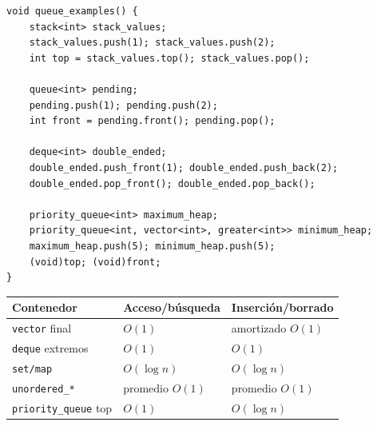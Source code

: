 \begin{lstlisting}[style=cpp]
void queue_examples() {
    stack<int> stack_values;
    stack_values.push(1); stack_values.push(2);
    int top = stack_values.top(); stack_values.pop();

    queue<int> pending;
    pending.push(1); pending.push(2);
    int front = pending.front(); pending.pop();

    deque<int> double_ended;
    double_ended.push_front(1); double_ended.push_back(2);
    double_ended.pop_front(); double_ended.pop_back();

    priority_queue<int> maximum_heap;
    priority_queue<int, vector<int>, greater<int>> minimum_heap;
    maximum_heap.push(5); minimum_heap.push(5);
    (void)top; (void)front;
}
\end{lstlisting}

\begin{center}
\begin{tabular}{lll}
Contenedor & Acceso/b\'usqueda & Inserci\'on/borrado \\
\hline
\texttt{vector} final & $O(1)$ & amortizado $O(1)$ \\
\texttt{deque} extremos & $O(1)$ & $O(1)$ \\
\texttt{set/map} & $O(\log n)$ & $O(\log n)$ \\
\texttt{unordered\_*} & promedio $O(1)$ & promedio $O(1)$ \\
\texttt{priority\_queue} top & $O(1)$ & $O(\log n)$ \\
\end{tabular}
\end{center}
